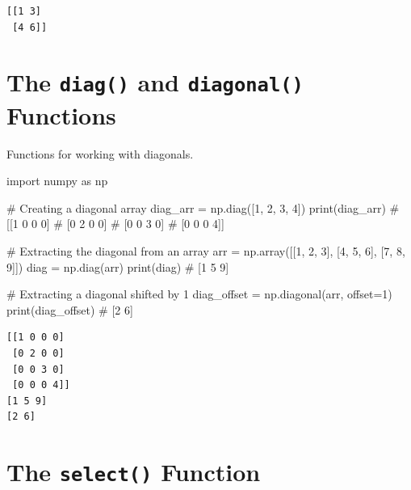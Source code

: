 \documentclass[
  english,
  letterpaper,
  DIV=11,
  numbers=noendperiod]{scrreprt}
\newenvironment{Shaded}{\begin{snugshade}}{\end{snugshade}}
\newcommand{\BuiltInTok}[1]{\textcolor[rgb]{0.00,0.23,0.31}{#1}}
\newcommand{\CommentTok}[1]{\textcolor[rgb]{0.37,0.37,0.37}{#1}}
\newcommand{\DecValTok}[1]{\textcolor[rgb]{0.68,0.00,0.00}{#1}}
\newcommand{\ImportTok}[1]{\textcolor[rgb]{0.00,0.46,0.62}{#1}}
\newcommand{\NormalTok}[1]{\textcolor[rgb]{0.00,0.23,0.31}{#1}}
\newcommand{\OperatorTok}[1]{\textcolor[rgb]{0.37,0.37,0.37}{#1}}
\begin{document}
\begin{verbatim}
[[1 3]
 [4 6]]
\end{verbatim}

\section{\texorpdfstring{The \texttt{diag()} and \texttt{diagonal()}
Functions}{The diag() and diagonal() Functions}}\label{the-diag-and-diagonal-functions}

Functions for working with diagonals.

\begin{Shaded}
\begin{Highlighting}[]
\ImportTok{import}\NormalTok{ numpy }\ImportTok{as}\NormalTok{ np}

\CommentTok{\# Creating a diagonal array}
\NormalTok{diag\_arr }\OperatorTok{=}\NormalTok{ np.diag([}\DecValTok{1}\NormalTok{, }\DecValTok{2}\NormalTok{, }\DecValTok{3}\NormalTok{, }\DecValTok{4}\NormalTok{])}
\BuiltInTok{print}\NormalTok{(diag\_arr)}
\CommentTok{\# [[1 0 0 0]}
\CommentTok{\#  [0 2 0 0]}
\CommentTok{\#  [0 0 3 0]}
\CommentTok{\#  [0 0 0 4]]}

\CommentTok{\# Extracting the diagonal from an array}
\NormalTok{arr }\OperatorTok{=}\NormalTok{ np.array([[}\DecValTok{1}\NormalTok{, }\DecValTok{2}\NormalTok{, }\DecValTok{3}\NormalTok{], [}\DecValTok{4}\NormalTok{, }\DecValTok{5}\NormalTok{, }\DecValTok{6}\NormalTok{], [}\DecValTok{7}\NormalTok{, }\DecValTok{8}\NormalTok{, }\DecValTok{9}\NormalTok{]])}
\NormalTok{diag }\OperatorTok{=}\NormalTok{ np.diag(arr)}
\BuiltInTok{print}\NormalTok{(diag)  }\CommentTok{\# [1 5 9]}

\CommentTok{\# Extracting a diagonal shifted by 1}
\NormalTok{diag\_offset }\OperatorTok{=}\NormalTok{ np.diagonal(arr, offset}\OperatorTok{=}\DecValTok{1}\NormalTok{)}
\BuiltInTok{print}\NormalTok{(diag\_offset)  }\CommentTok{\# [2 6]}
\end{Highlighting}
\end{Shaded}

\begin{verbatim}
[[1 0 0 0]
 [0 2 0 0]
 [0 0 3 0]
 [0 0 0 4]]
[1 5 9]
[2 6]
\end{verbatim}

\section{\texorpdfstring{The \texttt{select()}
Function}{The select() Function}}\label{the-select-function}
\end{document}
